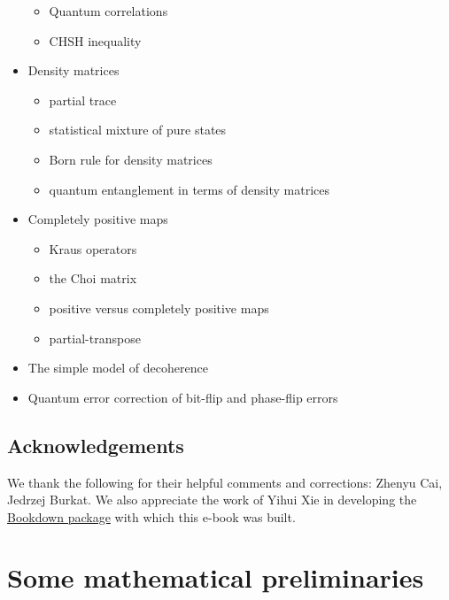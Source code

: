 \documentclass[fleqn]{article}
\providecommand{\tightlist}{%
  \setlength{\itemsep}{0pt}\setlength{\parskip}{0pt}}
\let\oldsection\section
\renewcommand\section{\clearpage\oldsection}
\begin{document}
\begin{itemize}
  \begin{itemize}
  \tightlist
  \item
    Quantum correlations
  \item
    CHSH inequality
  \end{itemize}
\item
  Density matrices

  \begin{itemize}
  \tightlist
  \item
    partial trace
  \item
    statistical mixture of pure states
  \item
    Born rule for density matrices
  \item
    quantum entanglement in terms of density matrices
  \end{itemize}
\item
  Completely positive maps

  \begin{itemize}
  \tightlist
  \item
    Kraus operators
  \item
    the Choi matrix
  \item
    positive versus completely positive maps
  \item
    partial-transpose
  \end{itemize}
\item
  The simple model of decoherence
\item
  Quantum error correction of bit-flip and phase-flip errors
\end{itemize}

\hypertarget{acknowledgements}{%
\subsection*{Acknowledgements}\label{acknowledgements}}

We thank the following for their helpful comments and corrections: Zhenyu Cai, Jedrzej Burkat.
We also appreciate the work of Yihui Xie in developing the \href{https://bookdown.org/yihui/bookdown/}{Bookdown package} with which this e-book was built.

\hypertarget{preliminaries}{%
\section*{Some mathematical preliminaries}\label{preliminaries}}
\end{document}
